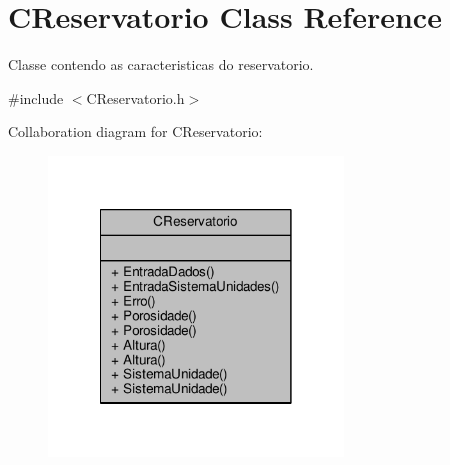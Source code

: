 \hypertarget{classCReservatorio}{\section{C\-Reservatorio Class Reference}
\label{classCReservatorio}
}


Classe contendo as caracteristicas do reservatorio.  




{\ttfamily \#include $<$C\-Reservatorio.\-h$>$}



Collaboration diagram for C\-Reservatorio\-:
\nopagebreak
\begin{figure}[H]
\begin{center}
\leavevmode
\includegraphics[width=222pt]{classCReservatorio__coll__graph}
\end{center}
\end{figure}

